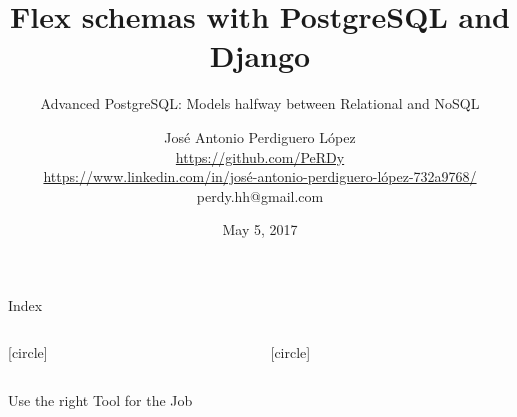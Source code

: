 \documentclass[final, 9pt, svgnames]{beamerPerdy}
\title{Flex schemas with PostgreSQL and Django}
\subtitle{Advanced PostgreSQL: Models halfway between Relational and NoSQL}
\author[J. A. Perdiguero López]{
José Antonio Perdiguero López\\
\href{https://github.com/PeRDy}{\scriptsize{\faGithub\; https://github.com/PeRDy}}\\
\href{https://www.linkedin.com/in/josé-antonio-perdiguero-lópez-732a9768/}{\scriptsize{\faLinkedin\; https://www.linkedin.com/in/josé-antonio-perdiguero-lópez-732a9768/}}\\
\scriptsize{\faAt\; perdy.hh@gmail.com}}
\date{May 5, 2017}
\institute[Málaga Python]{Málaga Python MeetUp\\OpenSouthCode 2017}
\begin{document}
\begin{frame}
    \titlepage
\end{frame}

\begin{frame}{Index}
    \begin{columns}[t]
        \begin{column}{.5\textwidth}
            [circle]
            \tableofcontents[sections={1-2}]
        \end{column}
        \begin{column}{.5\textwidth}
            [circle]
            \tableofcontents[sections={3-4}]
        \end{column}
    \end{columns}
\end{frame}






\begin{frame}[standout]
    \huge{Use the right Tool for the Job \!}

    \huge{\faWrench}
\end{frame}
\end{document}
